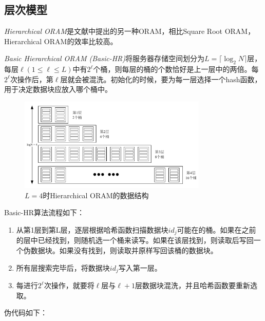 \subsection{层次模型}
\textit{Hierarchical ORAM}是文献\cite{ref5}中提出的另一种ORAM，相比Square Root ORAM，Hierarchical ORAM的效率比较高。\par
\textit{Basic Hierarchical ORAM (Basic-HR)}将服务器存储空间划分为$L=\lceil\log_2N\rceil$层，每层$\ell (1\leq\ell\leq L)$中有$2^\ell$个桶，则每层的桶的个数恰好是上一层中的两倍。每$2^\ell$次操作后，第$\ell$层就会被混洗。初始化的时候，要为每一层选择一个hash函数，用于决定数据块应放入哪个桶中。
\begin{figure}[H]
    \centering
    \includegraphics[width=0.8\textwidth]{orams/hierarchical.pdf}
    \caption{$L=4$时Hierarchical ORAM的数据结构}
    \label{fig:hier}
\end{figure}
Basic-HR算法流程如下：
\begin{enumerate}
    \item 从第1层到第L层，逐层根据哈希函数扫描数据块$id_j$可能在的桶。如果在之前的层中已经找到，则随机选一个桶来读写。如果在该层找到，则读取后写回一个伪数据块。如果没有找到，则读取并原样写回该桶的数据块。
    \item 所有层搜索完毕后，将数据块$id_j$写入第一层。
    \item 每进行$2^\ell$次操作，就要将$\ell$层与$\ell+1$层数据块混洗，并且哈希函数要重新选取。
\end{enumerate}
伪代码如下：
